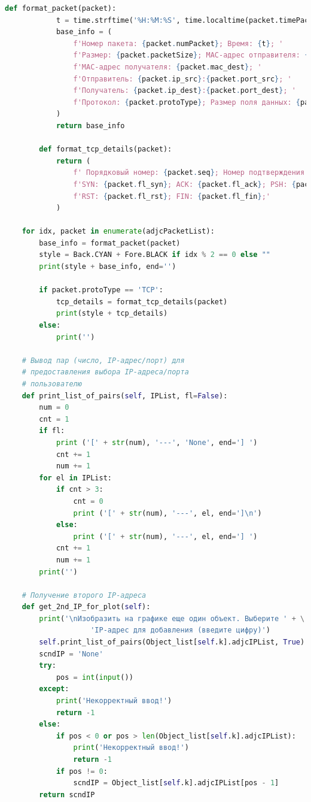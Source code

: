 \documentclass[spec, och, diploma]{SCWorks}
\begin{document}
\begin{lstlisting}[language=Python]
        def format_packet(packet):
            t = time.strftime('%H:%M:%S', time.localtime(packet.timePacket))
            base_info = (
                f'Номер пакета: {packet.numPacket}; Время: {t}; '
                f'Размер: {packet.packetSize}; MAC-адрес отправителя: {packet.mac_src}; '
                f'MAC-адрес получателя: {packet.mac_dest}; '
                f'Отправитель: {packet.ip_src}:{packet.port_src}; '
                f'Получатель: {packet.ip_dest}:{packet.port_dest}; '
                f'Протокол: {packet.protoType}; Размер поля данных: {packet.len_data};'
            )
            return base_info

        def format_tcp_details(packet):
            return (
                f' Порядковый номер: {packet.seq}; Номер подтверждения: {packet.ack}; '
                f'SYN: {packet.fl_syn}; ACK: {packet.fl_ack}; PSH: {packet.fl_psh}; '
                f'RST: {packet.fl_rst}; FIN: {packet.fl_fin};'
            )

    for idx, packet in enumerate(adjcPacketList):
        base_info = format_packet(packet)
        style = Back.CYAN + Fore.BLACK if idx % 2 == 0 else ""
        print(style + base_info, end='')

        if packet.protoType == 'TCP':
            tcp_details = format_tcp_details(packet)
            print(style + tcp_details)
        else:
            print('')

    # Вывод пар (число, IP-адрес/порт) для
    # предоставления выбора IP-адреса/порта
    # пользователю
    def print_list_of_pairs(self, IPList, fl=False):
        num = 0
        cnt = 1
        if fl:
            print ('[' + str(num), '---', 'None', end='] ')
            cnt += 1
            num += 1
        for el in IPList:
            if cnt > 3:
                cnt = 0
                print ('[' + str(num), '---', el, end=']\n')
            else:
                print ('[' + str(num), '---', el, end='] ')
            cnt += 1
            num += 1
        print('')

    # Получение второго IP-адреса
    def get_2nd_IP_for_plot(self):
        print('\nИзобразить на графике еще один объект. Выберите ' + \
                    'IP-адрес для добавления (введите цифру)')
        self.print_list_of_pairs(Object_list[self.k].adjcIPList, True)
        scndIP = 'None'
        try:
            pos = int(input())
        except:
            print('Некорректный ввод!')
            return -1
        else:
            if pos < 0 or pos > len(Object_list[self.k].adjcIPList):
                print('Некорректный ввод!')
                return -1
            if pos != 0:
                scndIP = Object_list[self.k].adjcIPList[pos - 1]
        return scndIP


\end{lstlisting}
\end{document}
